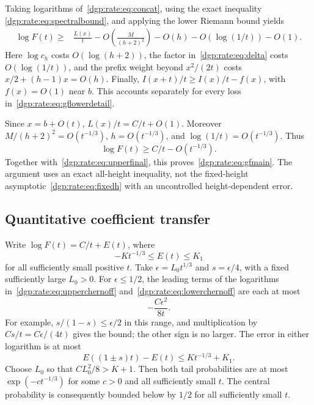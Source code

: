 \documentclass[11pt,letterpaper]{article}
\numberwithin{equation}{section}
\theoremstyle{remark}\newtheorem{remark}[theorem]{Remark}
\begin{document}
Taking logarithms of~\eqref{dgp:rate:eq:concat}, using the exact inequality
\eqref{dgp:rate:eq:spectralbound}, and applying the lower Riemann bound yields
\begin{align}
 \log F(t)\geq{}&\frac{L(x)}t-
    O\!\left(\frac{M}{(h+2)^2}\right)-O(h)
    -O(\log(1/t))-O(1).\label{dgp:rate:eq:gflowerdetail}
\end{align}
Here $\log c_h$ costs $O(\log(h+2))$, the factor in~\eqref{dgp:rate:eq:delta}
costs $O(\log(1/t))$, and the prefix weight beyond $x^2/(2t)$ costs
$x/2+(h-1)x=O(h)$. Finally,
$I(x+t)/t\geq I(x)/t-f(x)$, with $f(x)=O(1)$ near $b$.
This accounts separately for every loss in~\eqref{dgp:rate:eq:gflowerdetail}.

Since $x=b+O(t)$, $L(x)/t=C/t+O(1)$. Moreover
$M/(h+2)^2=O(t^{-1/3})$, $h=O(t^{-1/3})$, and
$\log(1/t)=O(t^{-1/3})$. Thus
\begin{equation}\label{dgp:rate:eq:gferror}
 \log F(t)\geq C/t-O(t^{-1/3}).
\end{equation}
Together with~\eqref{dgp:rate:eq:upperfinal}, this proves~\eqref{dgp:rate:eq:gfmain}.
The argument uses an exact all-height inequality, not the fixed-height
asymptotic~\eqref{dgp:rate:eq:fixedh} with an uncontrolled height-dependent error.

\subsection{Quantitative coefficient transfer}
Write $\log F(t)=C/t+E(t)$, where
\begin{equation}\label{dgp:rate:eq:E}
 -Kt^{-1/3}\leq E(t)\leq K_1
\end{equation}
for all sufficiently small positive $t$. Take
$\epsilon=L_0t^{1/3}$ and $s=\epsilon/4$, with a fixed sufficiently
large $L_0>0$. For $\epsilon\leq1/2$, the leading terms of the logarithms
in~\eqref{dgp:rate:eq:upperchernoff} and~\eqref{dgp:rate:eq:lowerchernoff} are each at most
\[
 -\frac{C\epsilon^2}{8t}.
\]
For example, $s/(1-s)\leq\epsilon/2$ in this range, and multiplication
by $Cs/t=C\epsilon/(4t)$ gives the bound; the other sign is no larger.
The error in either logarithm is at most
\[
 E((1\pm s)t)-E(t)\leq Kt^{-1/3}+K_1.
\]
Choose $L_0$ so that $CL_0^2/8>K+1$. Then both tail probabilities are
at most $\exp(-ct^{-1/3})$ for some $c>0$ and all sufficiently small $t$.
The central probability is consequently bounded below by $1/2$ for
all sufficiently small $t$.
\end{document}
